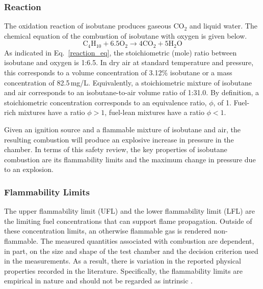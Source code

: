 \subsubsection{Reaction}
The oxidation reaction of %
isobutane produces gaseous CO$_2$ and liquid water.  The chemical equation of the combustion of isobutane with oxygen is given below.
\begin{equation}
\textrm{C}_{4}\textrm{H}_{10} + 6.5 \textrm{O}_{2} %
\rightarrow 4 \textrm{CO}_{2} + 5 \textrm{H}_{2}\textrm{O} %
\label{reaction_eq}
\end{equation}
As indicated in Eq.~\ref{reaction_eq}, the stoichiometric (mole) ratio between isobutane and oxygen is 1:6.5.  In dry air at standard temperature and pressure, this corresponds to a volume concentration of 3.12\% isobutane or a mass concentration of 82.5\,mg/L.  Equivalently, a stoichiometric mixture of isobutane and air corresponds to an isobutane-to-air volume ratio of 1:31.0.  By definition, a stoichiometric concentration corresponds to an equivalence ratio, $\phi$, of 1.  Fuel-rich mixtures have a ratio $\phi>1$, fuel-lean mixtures have a ratio $\phi<1$.

Given an ignition source and a flammable mixture of isobutane and air, the resulting combustion will produce an explosive increase in pressure in the chamber.  In terms of this safety review, the key properties of isobutane combustion are its flammability limits and the maximum change in pressure due to an explosion.

\subsubsection{Flammability Limits}
The upper flammability limit (UFL) and the lower flammability limit (LFL) are the limiting fuel concentrations that can support flame propagation.  Outside of these concentration limits, an otherwise flammable gas is rendered non-flammable.  %
The measured quantities associated with %
combustion are dependent, in part, on the size and shape of the test chamber \cite{Takahashi_2003} and the decision criterion \cite{DeSmedt_1999} used in the measurements.  As a result, there is variation in the reported physical properties recorded in the literature.  Specifically, the flammability limits are empirical in nature and should not be regarded as intrinsic \cite{Zabetakis_1965}.
